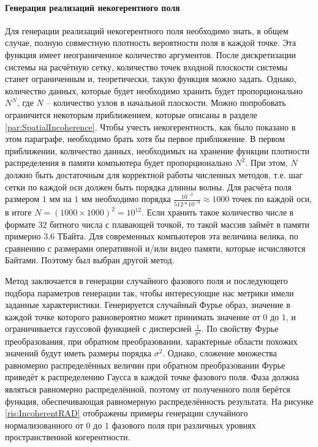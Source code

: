 \paragraph{Генерация реализаций некогерентного поля}
Для генерации реализаций некогерентного поля необходимо знать, в общем случае, полную совместную плотность вероятности поля в каждой точке. Эта функция имеет неограниченное количество аргументов. После дискретизации системы на расчётную сетку, количество точек входной плоскости системы станет ограниченным и, теоретически, такую функция можно задать. Однако, количество данных, которые будет необходимо хранить будет пропорционально $N^N$, где $N$ -- количество узлов в начальной плоскости. Можно попробовать ограничится некоторым приближением, которые описаны в разделе \ref{par:SpatialIncoherence}. Чтобы учесть некогерентность, как было показано в этом параграфе, необходимо брать хотя бы первое приближение. В первом приближении, количество данных, необходимых на хранение функции плотности распределения в памяти компьютера будет пропорционально $N^2$. При этом, $N$ должно быть достаточным для корректной работы численных методов, т.е. шаг сетки по каждой оси должен быть порядка длинны волны. Для расчёта поля размером $1$ мм на $1$ мм необходимо порядка $\frac{10^{-3}}{512*10^{-9}} \approx 1000$ точек по каждой оси, в итоге $N = (1000 \times 1000)^2 = 10^{12}$. Если хранить такое количество числе в формате $32$ битного числа с плавающей точкой, то такой массив займёт в памяти примерно $3.6$ ТБайта. Для современных компьютеров эта величина велика, по сравнению с размерами оперативной и/или видео памяти, которые исчисляются Байтами. Поэтому был выбран другой метод.
\par
Метод заключается в генерации случайного фазового поля и последующего подбора параметров генерации так, чтобы интересующие нас метрики имели заданные характеристики. Генерируется случайный Фурье образ, значение в каждой точке которого равновероятно может принимать значение от $0$ до $1$, и ограничивается гауссовой функцией с дисперсией $\frac{1}{\sigma^2}$. По свойству Фурье преобразования, при обратном преобразовании, характерные области похожих значений будут иметь размеры порядка $\sigma^2$. Однако, сложение множества равномерно распределённых величин при обратном преобразовании Фурье приведёт к распределению Гаусса в каждой точке фазового поля. Фаза должна являться равномерно распределённой, поэтому от полученного поля берётся функция, обеспечивающая равномерную распределённость результата. На рисунке \ref{ris:IncoherentRAD} отображены примеры генерации случайного нормализованного от $0$ до $1$ фазового поля при различных уровнях пространственной когерентности.

